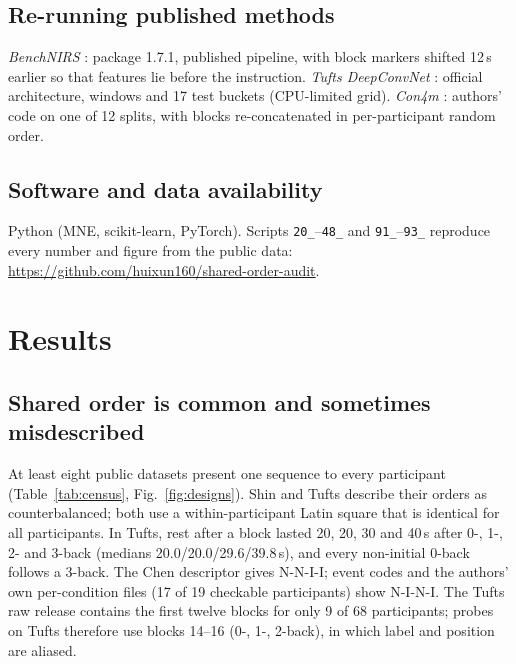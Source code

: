 \documentclass[preprint,11pt]{elsarticle}
\begin{document}
\subsection{Re-running published methods}
\emph{BenchNIRS} \citep{benerradi2023}: package 1.7.1, published pipeline, with block markers shifted 12\,s earlier so that features lie before the instruction. \emph{Tufts DeepConvNet} \citep{huang2021}: official architecture, windows and 17 test buckets (CPU-limited grid). \emph{Con4m} \citep{chen2024con4m}: authors' code on one of 12 splits, with blocks re-concatenated in per-participant random order.

\subsection{Software and data availability}
Python (MNE, scikit-learn, PyTorch). Scripts \texttt{20\_}--\texttt{48\_} and \texttt{91\_}--\texttt{93\_} reproduce every number and figure from the public data: \url{https://github.com/huixun160/shared-order-audit}.

\section{Results}
\label{sec:results}

\subsection{Shared order is common and sometimes misdescribed}
\label{sec:res-census}
At least eight public datasets present one sequence to every participant (Table~\ref{tab:census}, Fig.~\ref{fig:designs}). Shin and Tufts describe their orders as counterbalanced; both use a within-participant Latin square that is identical for all participants. In Tufts, rest after a block lasted 20, 20, 30 and 40\,s after 0-, 1-, 2- and 3-back (medians 20.0/20.0/29.6/39.8\,s), and every non-initial 0-back follows a 3-back. The Chen descriptor gives N-N-I-I; event codes and the authors' own per-condition files (17 of 19 checkable participants) show N-I-N-I. The Tufts raw release contains the first twelve blocks for only 9 of 68 participants; probes on Tufts therefore use blocks 14--16 (0-, 1-, 2-back), in which label and position are aliased.
\end{document}
